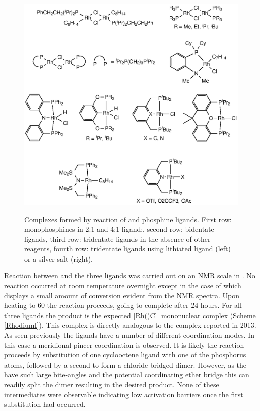 \begin{figure}[h!]
\begin{center}
\vspace{0.5cm}
\includegraphics{../Figures/RhCOEClcomplexes.eps}
\caption[Complexes formed by reaction of  and phosphine ligands]{Complexes formed by reaction of  and phosphine ligands.  First row: monophosphines in 2:1 and 4:1 ligand:, second row: bidentate ligands, third row: tridentate ligands in the absence of other reagents, fourth row: tridentate ligands using lithiated ligand (left) or a silver salt (right).}
\vspace{0.2cm}
\label{RhCOEClcomplexes}
\end{center}
\end{figure}
\vspace{0.2cm}

Reaction between  and the three \tBuxantphos{} ligands was carried out on an NMR scale in .  No reaction occurred at room temperature overnight except in the case of \tBuxantphos{} which displays a small amount of conversion evident from the NMR spectra.  Upon heating to 60 \degC{} the reaction proceeds, going to complete after 24 hours.  For all three \tBuxantphos{} ligands the product is the expected [Rh(\tBuxantphosk)Cl] mononuclear complex (Scheme \ref{RhodiumI}).  This complex is directly analogous to the \iPrxantphos{} complex reported in 2013\cite{Esteruelas2013}.  As seen previously the \tBuxantphos{} ligands have a number of different coordination modes.  In this case a meridional \POP{} pincer coordination is observed.  It is likely the reaction proceeds by substitution of one cyclooctene ligand with one of the phosphorus atoms, followed by a second to form a chloride bridged dimer.  However, as the \tBuxantphos{} have such large bite-angles and the potential coordinating ether bridge this can readily split the dimer resulting in the desired product.  None of these intermediates were observable indicating low activation barriers once the first substitution had occurred.  

